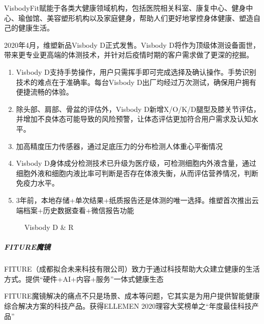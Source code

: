 \documentclass[letterpaper,10pt,english]{sphinxmanual}
\begin{document}
VisbodyFit赋能于各类大健康领域机构，包括医院相关科室、康复中心、健身中心、瑜伽馆、美容塑形机构以及家庭健身，帮助人们更好地掌控身体健康、塑造自己的健康生活。

2020年4月，维塑新品Visbody D正式发售。Visbody
D将作为顶级体测设备面世，带来更专业更高端的体测技术，并针对后疫情时期的客户需求做了更深的挖掘。%
\begin{footnote}[768]\sphinxAtStartFootnote
{}
%
\end{footnote}
\begin{enumerate}
%
\item {} 
Visbody
D支持手势操作，用户只需挥手即可完成选择及确认操作。手势识别技术的难点在于准确率。每台Visbody
D出厂均经过万次测试，确保用户拥有便捷流畅的体验。

\item {} 
除头部、肩部、骨盆的评估外，Visbody
D新增X/O/K/D腿型及膝关节评估，并增加不良体态可能导致的风险预警，让体态评估更加符合用户需求及认知水平。

\item {} 
加高精度压力传感器，通过足底压力的分布检测人体重心平衡情况

\item {} 
Visbody
D身体成分检测技术已升级为医疗级，可检测细胞内外液含量，通过细胞外液和细胞内液比率可判断是否存在体液失衡，从而评估营养情况，判断免疫力水平。

\item {} 
3年前，本地存储+单次结果+纸质报告还是体测的唯一选择。维塑首次推出云端档案+历史数据查看+微信报告功能

\end{enumerate}

\begin{figure}[H]
\centering
\capstart

\noindent{}
\caption{Visbody D \& R}\label{\detokenize{chapter_project/AI_fit:id23}}\end{figure}


\subparagraph{FITURE魔镜}
\label{\detokenize{chapter_project/AI_fit:fiture}}
FITURE（成都拟合未来科技有限公司）致力于通过科技帮助大众建立健康的生活方式。提供“硬件+AI+内容+服务”一体式健康生态

FITURE魔镜解决的痛点不只是场景、成本等问题，它其实是为用户提供智能健康综合解决方案的科技产品。获得ELLEMEN
2020理容大奖榜单之“年度最佳科技产品”
\end{document}
